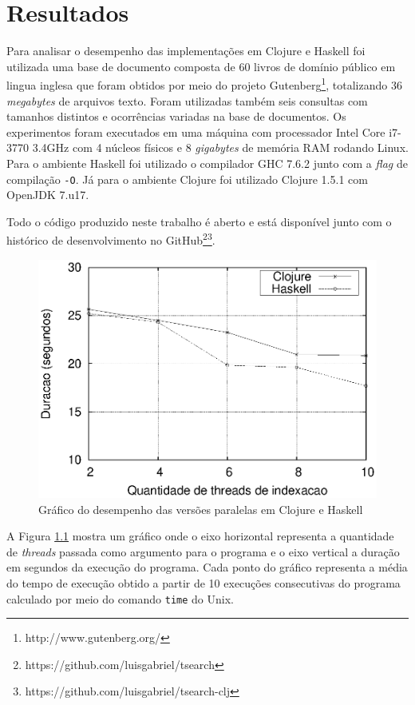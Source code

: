 \chapter{Resultados}

Para analisar o desempenho das implementações em Clojure e Haskell foi utilizada uma base de documento composta de 60 livros de domínio público em lingua inglesa que foram obtidos por meio do projeto Gutenberg\footnote{http://www.gutenberg.org/}, totalizando 36 \emph{megabytes} de arquivos texto. Foram utilizadas também seis consultas com tamanhos distintos e ocorrências variadas na base de documentos. Os experimentos foram executados em uma máquina com processador Intel Core i7-3770 3.4GHz com 4 núcleos físicos e 8 \emph{gigabytes} de memória RAM rodando Linux. Para o ambiente Haskell foi utilizado o compilador GHC 7.6.2 junto com a \emph{flag} de compilação \verb|-O|. Já para o ambiente Clojure foi utilizado Clojure 1.5.1 com OpenJDK 7.u17.

Todo o código produzido neste trabalho é aberto e está disponível junto com o histórico de desenvolvimento no GitHub\footnote{https://github.com/luisgabriel/tsearch}\footnote{https://github.com/luisgabriel/tsearch-clj}.

\begin{figure}[h]
 \centering
 \includegraphics[scale=0.85]{imagens/clojure-haskell.eps}
 \caption{Gráfico do desempenho das versões paralelas em Clojure e Haskell}
 \label{fig:clj-hs-comp}
\end{figure}

A Figura \ref{fig:clj-hs-comp} mostra um gráfico onde o eixo horizontal representa a quantidade de \emph{threads} passada como argumento para o programa e o eixo vertical a duração em segundos da execução do programa. Cada ponto do gráfico representa a média do tempo de execução obtido a partir de 10 execuções consecutivas do programa calculado por meio do comando \verb|time| do Unix.


